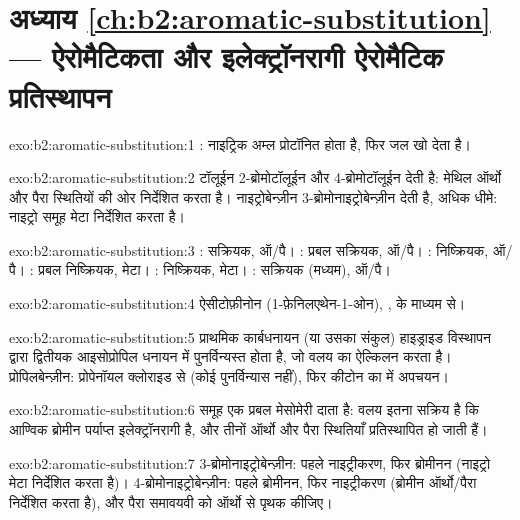 \section*{अध्याय \ref{ch:b2:aromatic-substitution} --- ऐरोमैटिकता और इलेक्ट्रॉनरागी ऐरोमैटिक प्रतिस्थापन}

\begin{solution}{exo:b2:aromatic-substitution:1}
: नाइट्रिक अम्ल प्रोटॉनित होता है, फिर जल खो देता है।
\end{solution}

\begin{solution}{exo:b2:aromatic-substitution:2}
टॉलूईन 2-ब्रोमोटॉलूईन और 4-ब्रोमोटॉलूईन देती है: मेथिल ऑर्थो और
पैरा स्थितियों की ओर निर्देशित करता है। नाइट्रोबेन्ज़ीन 3-ब्रोमोनाइट्रोबेन्ज़ीन देती है, अधिक धीमे: नाइट्रो समूह
मेटा निर्देशित करता है।
\end{solution}

\begin{solution}{exo:b2:aromatic-substitution:3}
: सक्रियक, ऑ/पै। : प्रबल सक्रियक, ऑ/पै। : निष्क्रियक, ऑ/पै।
: प्रबल निष्क्रियक, मेटा। : निष्क्रियक, मेटा। :
सक्रियक (मध्यम), ऑ/पै।
\end{solution}

\begin{solution}{exo:b2:aromatic-substitution:4}
ऐसीटोफ़ीनोन (1-फ़ेनिलएथेन-1-ओन), ,   के माध्यम से।
\end{solution}

\begin{solution}{exo:b2:aromatic-substitution:5}
प्राथमिक कार्बधनायन (या उसका संकुल) हाइड्राइड विस्थापन द्वारा द्वितीयक
आइसोप्रोपिल धनायन में पुनर्विन्यस्त होता है, जो वलय का ऐल्किलन करता है। प्रोपिलबेन्ज़ीन: प्रोपेनॉयल क्लोराइड से
 (कोई पुनर्विन्यास नहीं), फिर कीटोन  का  में अपचयन।
\end{solution}

\begin{solution}{exo:b2:aromatic-substitution:6}
 समूह एक प्रबल मेसोमेरी दाता है: वलय इतना सक्रिय है कि आण्विक ब्रोमीन
पर्याप्त इलेक्ट्रॉनरागी है, और तीनों ऑर्थो और पैरा स्थितियाँ प्रतिस्थापित हो जाती हैं।
\end{solution}

\begin{solution}{exo:b2:aromatic-substitution:7}
3-ब्रोमोनाइट्रोबेन्ज़ीन: पहले नाइट्रीकरण, फिर ब्रोमीनन (नाइट्रो मेटा निर्देशित करता है)। 4-ब्रोमोनाइट्रोबेन्ज़ीन:
पहले ब्रोमीनन, फिर नाइट्रीकरण (ब्रोमीन ऑर्थो/पैरा निर्देशित करता है), और पैरा समावयवी को
ऑर्थो से पृथक कीजिए।
\end{solution}

